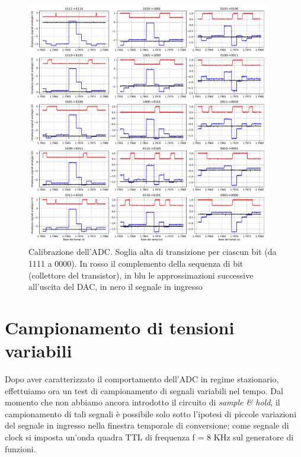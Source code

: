\documentclass[journal]{IEEEtran}
\begin{document}
\clearpage


\begin{figure}[t]%
\centering
\includegraphics[trim = {30 0 50 0}, width=0.95\textwidth]{analysis/output/calibration.pdf}
\caption{Calibrazione dell'ADC. Soglia alta di transizione per ciascun bit (da 1111 a 0000). In rosso il complemento della sequenza di bit (collettore del transistor), in blu le approssimazioni successive all'uscita del DAC, in nero il segnale in ingresso}
\label{fig:BIT_high_transition_threshold}
\end{figure}

\clearpage

\section{Campionamento di tensioni variabili}
Dopo aver caratterizzato il comportamento dell'ADC in regime stazionario, effettuiamo ora un test di campionamento di segnali variabili nel tempo. Dal momento che non abbiamo ancora introdotto il circuito di \textit{sample \& hold}, il campionamento di tali segnali è possibile solo sotto l'ipotesi di piccole variazioni del segnale in ingresso nella finestra temporale di conversione; come segnale di clock si imposta un'onda quadra TTL di frequenza f = 8 KHz sul generatore di funzioni. 
\end{document}

